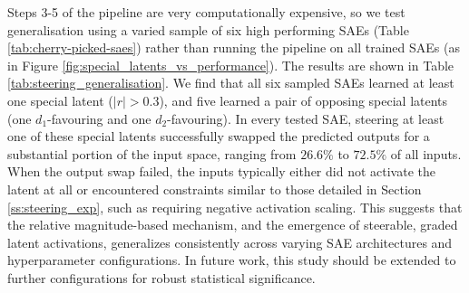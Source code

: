 Steps 3-5 of the pipeline are very computationally expensive, so we test generalisation using a varied sample of six high performing SAEs (Table \ref{tab:cherry-picked-saes}) rather than running the pipeline on all trained SAEs (as in Figure \ref{fig:special_latents_vs_performance}).
The results are shown in Table \ref{tab:steering_generalisation}.
We find that all six sampled SAEs learned at least one special latent ($|r| > 0.3$), and five learned a pair of opposing special latents (one $d_1$-favouring and one $d_2$-favouring). In every tested SAE, steering at least one of these special latents successfully swapped the predicted outputs for a substantial portion of the input space, ranging from $26.6\%$ to $72.5\%$ of all inputs. When the output swap failed, the inputs typically either did not activate the latent at all or encountered constraints similar to those detailed in Section \ref{ss:steering_exp}, such as requiring negative activation scaling. This suggests that the relative magnitude-based mechanism, and the emergence of steerable, graded latent activations, generalizes consistently across varying SAE architectures and hyperparameter configurations. In future work, this study should be extended to further configurations for robust statistical significance.